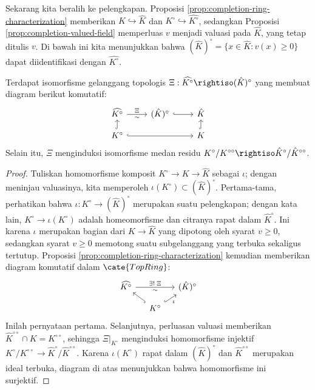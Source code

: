 Sekarang kita beralih ke pelengkapan. Proposisi \ref{prop:completion-ring-characterization} memberikan $K \hookrightarrow \hat{K}$ dan $K^\circ \hookrightarrow \widehat{K^\circ}$, sedangkan Proposisi \ref{prop:completion-valued-field} memperluas $v$ menjadi valuasi pada $\hat{K}$, yang tetap ditulis $v$. Di bawah ini kita menunjukkan bahwa $(\hat{K})^\circ = \{ x \in \hat{K}: v(x) \geq 0 \} $ dapat diidentifikasi dengan $\widehat{K^\circ}$.

\begin{proposition}\label{prop:K-circ-completion}
	Terdapat isomorfisme gelanggang topologis $\Xi: \widehat{K^\circ} \rightiso (\hat{K})^\circ$ yang membuat diagram berikut komutatif:
	\[ \begin{tikzcd}[row sep=small]
		\widehat{K^\circ} \arrow[r, "\Xi", "\sim"'] & (\hat{K})^\circ \arrow[hookrightarrow, r] & \hat{K} \\
		K^\circ \arrow[hookrightarrow, u] \arrow[hookrightarrow, rr] & & K \arrow[hookrightarrow, u]
	\end{tikzcd}\]
	Selain itu, $\Xi$ menginduksi isomorfisme medan residu $K^\circ/K^{\circ\circ} \rightiso \hat{K}^\circ/\hat{K}^{\circ\circ}$.
\end{proposition}
\begin{proof}
	Tuliskan homomorfisme komposit $K^\circ \to K \to \hat{K}$ sebagai $\iota$; dengan meninjau valuasinya, kita memperoleh $\iota(K^\circ) \subset (\hat{K})^\circ$. Pertama-tama, perhatikan bahwa $\iota: K^\circ \to (\hat{K})^\circ$ merupakan suatu pelengkapan; dengan kata lain, $K^\circ \to \iota(K^\circ)$ adalah homeomorfisme dan citranya rapat dalam $\hat{K}^\circ$. Ini karena $\iota$ merupakan bagian dari $K \to \hat{K}$ yang dipotong oleh syarat $v \geq 0$, sedangkan syarat $v \geq 0$ memotong suatu subgelanggang yang terbuka sekaligus tertutup. Proposisi \ref{prop:completion-ring-characterization} kemudian memberikan diagram komutatif dalam $\cate{TopRing}$:
	\[\begin{tikzcd}[column sep=small, row sep=small]
		\widehat{K^\circ} \arrow[rr, "{\exists!\; \Xi}", "\sim"'] & & (\hat{K})^\circ \\
		& K^\circ \arrow[hookrightarrow, lu] \arrow[hookrightarrow, ru, "\iota"'] &
	\end{tikzcd}\]
	Inilah pernyataan pertama. Selanjutnya, perluasan valuasi memberikan $\hat{K}^{\circ\circ} \cap K = K^{\circ\circ}$, sehingga $\Xi|_{K^\circ}$ menginduksi homomorfisme injektif $K^\circ/K^{\circ\circ} \to \hat{K}^\circ/\hat{K}^{\circ\circ}$. Karena $\iota(K^\circ)$ rapat dalam $(\hat{K})^\circ$ dan $\hat{K}^{\circ\circ}$ merupakan ideal terbuka, diagram di atas menunjukkan bahwa homomorfisme ini surjektif.
\end{proof}


